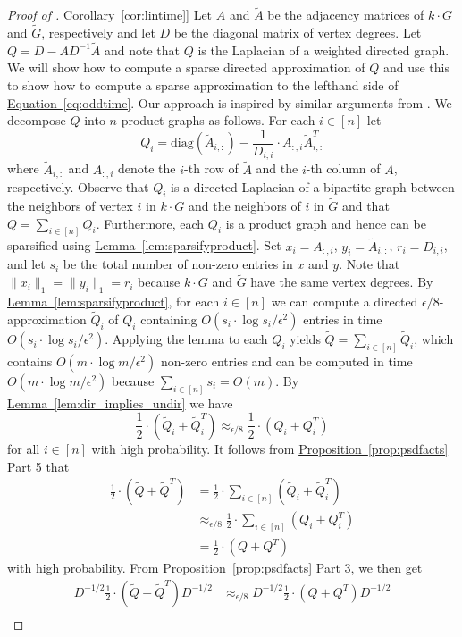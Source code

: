 \documentclass[11pt]{article}
\numberwithin{equation}{section}
\theoremstyle{definition}
\theoremstyle{plain}
\newcommand{\expref}[2]{\hyperref[#2]{#1~\ref{#2}}}
\newcommand{\expeqref}[2]{\hyperref[#2]{#1~\eqref{#2}}}
\newcommand{\wt}{\widetilde}   %
\numberwithin{myalgctr}{section}
\theoremstyle{named}
\begin{document}
\begin{proof}[Proof of \expref{Corollary}{cor:lintime}]
Let $A$ and $\wt{A}$ be the adjacency matrices of $k\cdot G$ and $\wt{G}$, respectively and let $D$ be the diagonal matrix of vertex degrees. Let $Q=D-AD^{-1}\wt{A}$ and note that $Q$ is the Laplacian of a weighted directed graph. We will show how to compute a sparse directed approximation of $Q$ and use this to show how to compute a sparse approximation to the lefthand side of \expeqref{Equation}{eq:oddtime}. Our approach is inspired by similar arguments from \cite{PS13, CKPPRSV16}. We decompose $Q$ into $n$ product graphs as follows. For each $i\in[n]$ let
\[
Q_i = \mathrm{diag}(\wt{A}_{i,:})-\frac{1}{D_{i,i}}\cdot A_{:,i}\wt{A}_{i,:}^T
\]
where $\wt{A}_{i,:}$ and $A_{:,i}$ denote the $i$-th row of $\wt{A}$ and the $i$-th column of $A$, respectively. Observe that $Q_i$ is a directed Laplacian of a bipartite graph between the neighbors of vertex $i$ in $k\cdot G$ and the neighbors of $i$ in $\wt{G}$ and that
$Q=\sum_{i\in [n]}Q_i$. Furthermore, each $Q_i$ is a product graph and hence can be sparsified using \expref{Lemma}{lem:sparsifyproduct}. Set $x_i=A_{:,i}$, $y_i=\wt{A}_{i,:}$, $r_i=D_{i,i}$, and let $s_i$ be the total number of non-zero entries in $x$ and $y$. Note that $\|x_i\|_1=\|y_i\|_1=r_i$ because $k\cdot G$ and $\wt{G}$ have the same vertex degrees. By \expref{Lemma}{lem:sparsifyproduct}, for each $i\in[n]$ we can compute a directed $\epsilon/8$-approximation $\wt{Q}_i$ of $Q_i$ containing $O(s_i\cdot \log s_i/\epsilon^2)$ entries in time $O(s_i\cdot \log s_i/\epsilon^2)$. Applying the lemma to each $Q_i$ yields $\wt{Q}=\sum_{i\in [n]}\wt{Q}_i$, which contains $O(m\cdot \log m/\epsilon^2)$ non-zero entries and can be computed in time $O(m\cdot \log m/\epsilon^2)$ because $\sum_{i\in[n]}s_i=O(m)$. By \expref{Lemma}{lem:dir_implies_undir} we have 
\[
\frac{1}{2}\cdot(\wt{Q}_i+\wt{Q}_i^T)\approx_{\epsilon/8}\frac{1}{2}\cdot(Q_i+Q_i^T)
\]
for all $i\in[n]$ with high probability. It follows from \expref{Proposition}{prop:psdfacts} Part 5 that
\begin{align*}
\frac{1}{2}\cdot(\wt{Q}+\wt{Q}^T)&=\frac{1}{2}\cdot\sum_{i\in [n]}(\wt{Q}_i+\wt{Q}_i^T)\\
&\approx_{\epsilon/8}\frac{1}{2}\cdot\sum_{i\in [n]}(Q_i+Q_i^T)\\
&=\frac{1}{2}\cdot(Q+Q^T)
\end{align*}
with high probability. {}From \expref{Proposition}{prop:psdfacts} Part 3, we then get
\begin{align*}
D^{-1/2}\frac{1}{2}\cdot(\wt{Q}+\wt{Q}^T)D^{-1/2}&\approx_{\epsilon/8}D^{-1/2}\frac{1}{2}\cdot(Q+Q^T)D^{-1/2}\\

\end{align*}
\end{proof}
\end{document}
